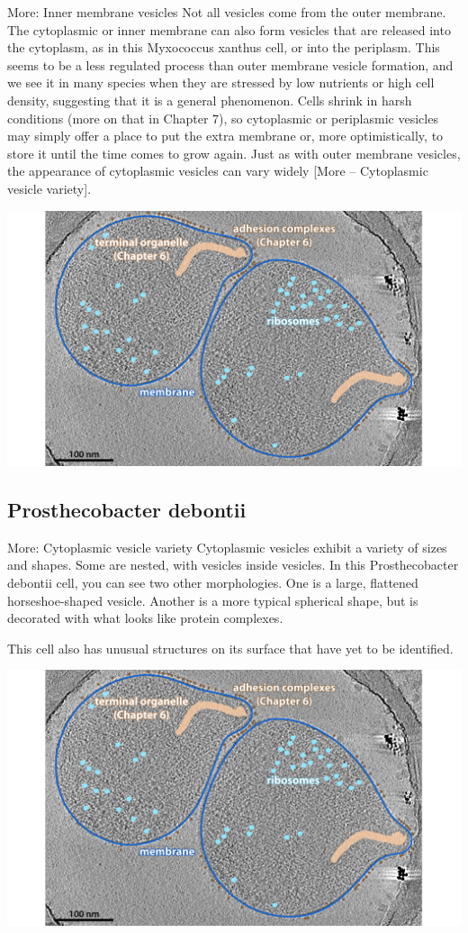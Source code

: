 \documentclass[]{tufte-book}
\begin{document}
More: Inner membrane vesicles Not all vesicles come from the outer
membrane. The cytoplasmic or inner membrane can also form vesicles that
are released into the cytoplasm, as in this Myxococcus xanthus cell, or
into the periplasm. This seems to be a less regulated process than outer
membrane vesicle formation, and we see it in many species when they are
stressed by low nutrients or high cell density, suggesting that it is a
general phenomenon. Cells shrink in harsh conditions (more on that in
Chapter 7), so cytoplasmic or periplasmic vesicles may simply offer a
place to put the extra membrane or, more optimistically, to store it
until the time comes to grow again. Just as with outer membrane
vesicles, the appearance of cytoplasmic vesicles can vary widely {[}More
-- Cytoplasmic vesicle variety{]}.

\includegraphics{img/02_static/2_1_Mgenitalium}

\subsection{Prosthecobacter debontii}\label{prosthecobacter-debontii}

More: Cytoplasmic vesicle variety Cytoplasmic vesicles exhibit a variety
of sizes and shapes. Some are nested, with vesicles inside vesicles. In
this Prosthecobacter debontii cell, you can see two other morphologies.
One is a large, flattened horseshoe-shaped vesicle. Another is a more
typical spherical shape, but is decorated with what looks like protein
complexes.

This cell also has unusual structures on its surface that have yet to be
identified.

\includegraphics{img/02_static/2_1_Mgenitalium}
\end{document}
